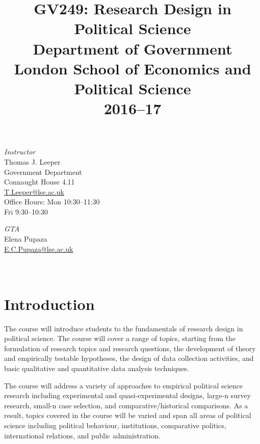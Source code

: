 \documentclass[12pt,a4paper]{article}
\title{\textbf{GV249: Research Design in Political Science}\\Department of Government\\London School of Economics and Political Science\\2016--17}
\author{}
\date{}
\begin{document}
\nobibliography*
\faketableofcontents

\maketitle

\vspace{-4em}

\begin{minipage}[t]{0.5\linewidth}
\textit{Instructor}\\
Thomas J. Leeper\\
Government Department\\
Connaught House 4.11\\
\href{mailto:t.leeper@lse.ac.uk}{T.Leeper@lse.ac.uk}\\
Office Hours: Mon 10:30--11:30\\
\phantom{Office Hours:} Fri 9:30--10:30\\
\end{minipage}
\begin{minipage}[t]{0.5\linewidth}
\textit{GTA}\\
Elena Pupaza\\
\href{mailto:E.C.Pupaza@lse.ac.uk}{E.C.Pupaza@lse.ac.uk}\\
\hspace{1em}\\
\hspace{1em}\\
\end{minipage}

\section{Introduction}
The course will introduce students to the fundamentals of research design in political science. The course will cover a range of topics, starting from the formulation of research topics and research questions, the development of theory and empirically testable hypotheses, the design of data collection activities, and basic qualitative and quantitative data analysis techniques. 

The course will address a variety of approaches to empirical political science research including experimental and quasi-experimental designs, large-n survey research, small-n case selection, and comparative/historical comparisons. As a result, topics covered in the course will be varied and span all areas of political science including political behaviour, institutions, comparative politics, international relations, and public administration.
\end{document}

